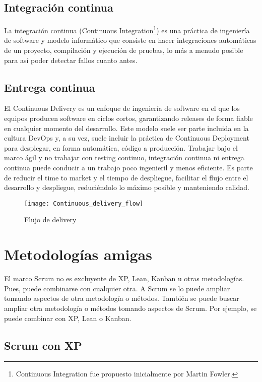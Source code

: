 \subsection{Integración continua}

La integración continua (Continuous Integration\footnote{Continuous Integration fue propuesto inicialmente por Martin Fowler.}) es una práctica de ingeniería de software y modelo informático que consiste en hacer integraciones automáticas de un proyecto, compilación y ejecución de pruebas, lo más a menudo posible para así poder detectar fallos cuanto antes.

\subsection{Entrega continua}

El Continuous Delivery es un enfoque de ingeniería de software en el que los equipos producen software en ciclos cortos, garantizando releases de forma fiable en cualquier momento del desarrollo. Este modelo suele ser parte incluida en la cultura DevOps y, a su vez, suele incluir la práctica de Continuous Deployment para desplegar, en forma automática, código a producción. Trabajar bajo el marco ágil y no trabajar con testing continuo, integración continua ni entrega continua puede conducir a un trabajo poco ingenieril y menos eficiente. Es parte de reducir el time to market y el tiempo de despliegue, facilitar el flujo entre el desarrollo y despliegue, reduciéndolo lo máximo posible y manteniendo calidad.

\begin{figure}[h]
  \centering
  \texttt{[image: Continuous\_delivery\_flow]}
  \caption{Flujo de delivery}
  \centering
  \label{fig:Continuous_delivery_flow} %
\end{figure}

\newpage
\section{Metodologías amigas}

El marco Scrum no es excluyente de XP, Lean, Kanban u otras metodologías. Pues, puede combinarse con cualquier otra. A Scrum se lo puede ampliar tomando aspectos de otra metodología o métodos. También se puede buscar ampliar otra metodología o métodos tomando aspectos de Scrum. Por ejemplo, se puede combinar con XP, Lean o Kanban.

\subsection{Scrum con XP}

